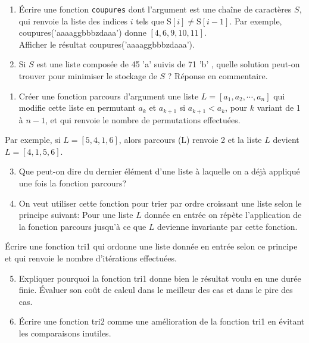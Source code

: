 \begin{enumerate}
\item Écrire une fonction \texttt{coupures} dont l'argument est une chaîne de caractères $S$, qui renvoie la liste des indices $i$ tels que $\mathrm{S}[i] \neq \mathrm{S}[i-1]$. Par exemple, coupures('aaaaggbbbzdaaa') donne $[4,6,9,10,11]$.\\
Afficher le résultat coupures('aaaaggbbbzdaaa').

\item Si $S$ est une liste composée de 45 'a' suivis de 71 'b' , quelle solution peut-on trouver pour minimiser le stockage de $S$ ? Réponse en commentaire.

\end{enumerate}




\begin{exercice}
\begin{enumerate}
  \item Créer une fonction parcours d'argument une liste $L=\left[a_{1}, a_{2}, \cdots, a_{n}\right]$ qui modifie cette liste en permutant $a_{k}$ et $a_{k+1}$ si $a_{k+1}<a_{k}$, pour $k$ variant de 1 à $n-1$, et qui renvoie le nombre de permutations effectuées.
\end{enumerate}
Par exemple, si $L=[5,4,1,6]$, alors parcours (L) renvoie 2 et la liste $L$ devient $L=[4,1,5,6]$.

\begin{enumerate}
  \setcounter{enumi}{2}
  \item Que peut-on dire du dernier élément d'une liste à laquelle on a déjà appliqué une fois la fonction parcours?

  \item On veut utiliser cette fonction pour trier par ordre croissant une liste selon le principe suivant: Pour une liste $L$ donnée en entrée on répète l'application de la fonction parcours jusqu'à ce que $L$ devienne invariante par cette fonction.

\end{enumerate}
Écrire une fonction tri1 qui ordonne une liste donnée en entrée selon ce principe et qui renvoie le nombre d'itérations effectuées.

\begin{enumerate}
  \setcounter{enumi}{4}
  \item Expliquer pourquoi la fonction tri1 donne bien le résultat voulu en une durée finie. Évaluer son coût de calcul dans le meilleur des cas et dans le pire des cas.

  \item Écrire une fonction tri2 comme une amélioration de la fonction tri1 en évitant les comparaisons inutiles.

\end{enumerate}
\end{exercice}



